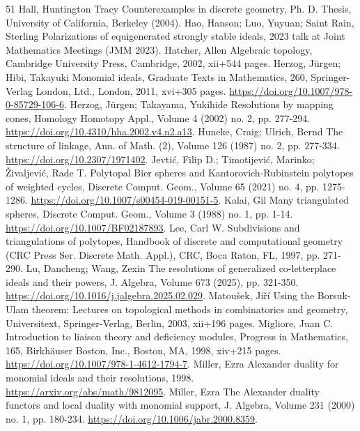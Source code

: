 \documentclass[10pt,a4paper]{article}
\theoremstyle{definition}
\theoremstyle{remark}
\theoremstyle{plain}
\begin{document}
\begin{thebibliography}{51}
 Hall, Huntington Tracy Counterexamples in discrete geometry, Ph. D. Thesis, University of California, Berkeley (2004).
 Hao, Hanson; Luo, Yuyuan; Saint Rain, Sterling Polarizations of equigenerated strongly stable ideals, 2023 talk at Joint Mathematics Meetings (JMM 2023).
 Hatcher, Allen Algebraic topology, Cambridge University Press, Cambridge, 2002, xii+544 pages.
 Herzog, Jürgen; Hibi, Takayuki Monomial ideals, Graduate Texts in Mathematics, 260, Springer-Verlag London, Ltd., London, 2011, xvi+305 pages. \url{https://doi.org/10.1007/978-0-85729-106-6}.
 Herzog, Jürgen; Takayama, Yukihide Resolutions by mapping cones, Homology Homotopy Appl., Volume 4 (2002) no. 2, pp. 277-294. \url{https://doi.org/10.4310/hha.2002.v4.n2.a13}.
 Huneke, Craig; Ulrich, Bernd The structure of linkage, Ann. of Math. (2), Volume 126 (1987) no. 2, pp. 277-334. \url{https://doi.org/10.2307/1971402}.
 Jevtić, Filip D.; Timotijević, Marinko; Živaljević, Rade T. Polytopal Bier spheres and Kantorovich-Rubinstein polytopes of weighted cycles, Discrete Comput. Geom., Volume 65 (2021) no. 4, pp. 1275-1286. \url{https://doi.org/10.1007/s00454-019-00151-5}.
 Kalai, Gil Many triangulated spheres, Discrete Comput. Geom., Volume 3 (1988) no. 1, pp. 1-14. \url{https://doi.org/10.1007/BF02187893}.
 Lee, Carl W. Subdivisions and triangulations of polytopes, Handbook of discrete and computational geometry (CRC Press Ser. Discrete Math. Appl.), CRC, Boca Raton, FL, 1997, pp. 271-290.
 Lu, Dancheng; Wang, Zexin The resolutions of generalized co-letterplace ideals and their powers, J. Algebra, Volume 673 (2025), pp. 321-350. \url{https://doi.org/10.1016/j.jalgebra.2025.02.029}.
 Matoušek, Jiří Using the Borsuk-Ulam theorem: Lectures on topological methods in combinatorics and geometry, Universitext, Springer-Verlag, Berlin, 2003, xii+196 pages.
 Migliore, Juan C. Introduction to liaison theory and deficiency modules, Progress in Mathematics, 165, Birkhäuser Boston, Inc., Boston, MA, 1998, xiv+215 pages. \url{https://doi.org/10.1007/978-1-4612-1794-7}.
 Miller, Ezra Alexander duality for monomial ideals and their resolutions, 1998. \url{https://arxiv.org/abs/math/9812095}.
 Miller, Ezra The Alexander duality functors and local duality with monomial support, J. Algebra, Volume 231 (2000) no. 1, pp. 180-234. \url{https://doi.org/10.1006/jabr.2000.8359}.

\end{thebibliography}
\end{document}
